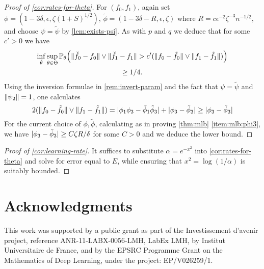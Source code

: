 \documentclass[journal]{IEEEtran}
\newcommand{\1}{\boldsymbol{1}}
\newcommand{\PP}{\mathbb{P}}
\DeclarePairedDelimiter{\brackets}{(}{)}
\DeclarePairedDelimiter{\norm}{\lVert}{\rVert}
\DeclarePairedDelimiter{\abs}{\lvert}{\rvert}
\begin{document}
\begin{proof}[Proof of \cref{cor:rates-for-theta}]
	For $(f_0,f_1)$, again set $\phi=(1-3\delta,\epsilon,\zeta(1+S)^{1/2})$, $\tilde{\phi}=(1-3\delta-R,\epsilon,\zeta)$ where $R=c\epsilon^{-2}\zeta^{-3}n^{-1/2}$, and choose $\psi=\tilde{\psi}$ by \cref{lem:exists-psi}. As with $p$ and $q$ we deduce that for some $c'>0$ we have
        \begin{multline*}
          \inf_{\check{\theta}}\sup_{\theta\in \Theta} \PP_{\theta}\brackets[\Big]{\norm{\check{f}_0-f_0}\vee\norm{\check{f}_1-f_1}>c'(\norm{f_0-\tilde{f}_0}\vee \norm{f_1-\tilde{f}_1})}\\
          \geq 1/4.
        \end{multline*}
	Using the inversion formulae in \cref{rem:invert-param} and the fact that $\psi=\tilde{\psi}$ and $\norm{\psi_2}=1$, one calculates
	\[ 2(\norm{f_0-\tilde{f}_0}\vee\norm{f_1-\tilde{f}_1}) = \abs{\phi_1\phi_3-\tilde{\phi}_1\tilde{\phi}_3}+\abs{\phi_3-\tilde{\phi}_3}\geq \abs{\phi_3-\tilde{\phi}_3}\]
	For the current choice of $\phi,\tilde{\phi}$, calculating as in proving \cref{thm:mlb} \cref{item:mlb:phi3}, we have $\abs{\phi_3-\tilde{\phi}_3}\geq C\zeta R/\delta$ for some $C>0$ and we deduce the lower bound.
\end{proof}

\begin{proof}[Proof of \cref{cor:learning-rate}]
	It suffices to substitute $\alpha=e^{-x^2}$ into \cref{cor:rates-for-theta} and solve for error equal to $E$, while ensuring that $x^2=\log(1/\alpha)$ is suitably bounded.
\end{proof}


\section*{Acknowledgments}

This work was supported by a public grant as part of the Investissement d'avenir project, reference ANR-11-LABX-0056-LMH, LabEx LMH,  by Institut Universitaire de France, and by the EPSRC Programme Grant on the Mathematics of Deep Learning, under the project: EP/V026259/1.











\end{document}
